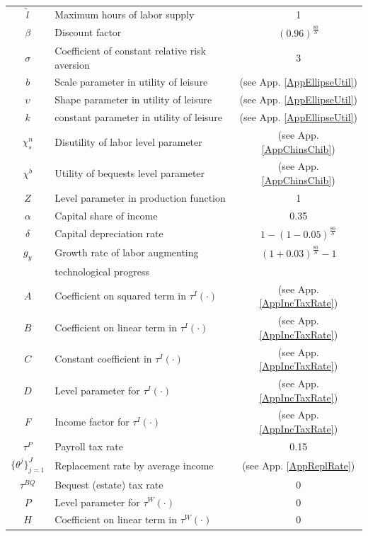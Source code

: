 \begin{spacing}{1.5}
\begin{table}[htbp]
\begin{threeparttable}
\begin{tabular}{>{\footnotesize}c |>{\footnotesize}l |>{\footnotesize}c}
        $\tilde{l}$ & Maximum hours of labor supply & 1 \\
        $\beta$ & Discount factor & $(0.96)^\frac{80}{S}$ \\
        $\sigma$ & Coefficient of constant relative risk aversion & 3 \\
        $b$ & Scale parameter in utility of leisure & (see App. \ref{AppEllipseUtil}) \\
        $\upsilon$ & Shape parameter in utility of leisure & (see App. \ref{AppEllipseUtil}) \\
        $k$ & constant parameter in utility of leisure & (see App. \ref{AppEllipseUtil}) \\
        $\chi^n_s$ & Disutility of labor level parameter & (see App. \ref{AppChinsChib}) \\
        $\chi^b$ & Utility of bequests level parameter & (see App. \ref{AppChinsChib}) \\
        \hline
        $Z$ & Level parameter in production function & 1 \\
        $\alpha$ & Capital share of income & 0.35 \\
        $\delta$ & Capital depreciation rate & $1-(1-0.05)^\frac{80}{S}$ \\
        $g_y$ & Growth rate of labor augmenting & $(1+0.03)^\frac{80}{S}-1$ \\[-2mm]
        & \quad technological progress & \\
        \hline
        $A$ & Coefficient on squared term in $\tau^I(\cdot)$ & (see App. \ref{AppIncTaxRate}) \\
        $B$ & Coefficient on linear term in $\tau^I(\cdot)$ & (see App. \ref{AppIncTaxRate}) \\
        $C$ & Constant coefficient in $\tau^I(\cdot)$ & (see App. \ref{AppIncTaxRate}) \\
        $D$ & Level parameter for $\tau^I(\cdot)$ & (see App. \ref{AppIncTaxRate}) \\
        $F$ & Income factor for $\tau^I(\cdot)$ & (see App. \ref{AppIncTaxRate}) \\
        $\tau^P$ & Payroll tax rate & 0.15 \\
        $\{\theta^j\}_{j=1}^J$ & Replacement rate by average income & (see App. \ref{AppReplRate}) \\
        $\tau^{BQ}$ & Bequest (estate) tax rate & 0 \\
        $P$ & Level parameter for $\tau^W(\cdot)$ & 0 \\
        $H$ & Coefficient on linear term in $\tau^W(\cdot)$ & 0 \\

\end{tabular}
\end{threeparttable}
\end{table}
\end{spacing}
